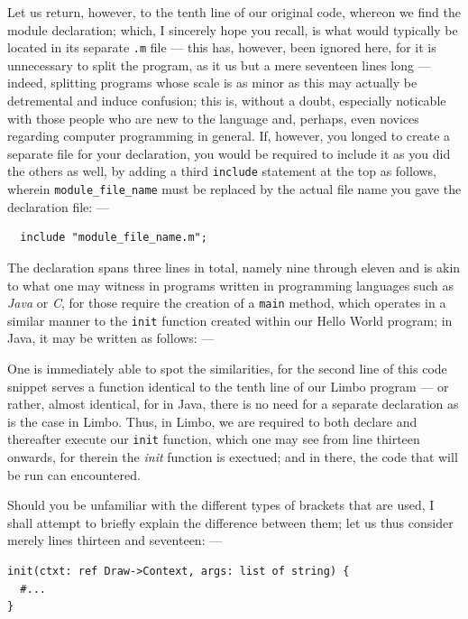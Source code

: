 \documentclass[a5paper,twoside,12pt]{report}
\begin{document}
Let us return, however, to the tenth line of our original code, whereon we find the module declaration; which, I sincerely hope you recall, is what would typically be located in its separate \texttt{.m} file — this has, however, been ignored here, for it is unnecessary to split the program, as it us but a mere seventeen lines long — indeed, splitting programs whose scale is as minor as this may actually be detremental and induce confusion; this is, without a doubt, especially noticable with those people who are new to the language and, perhaps, even novices regarding computer programming in general. If, however, you longed to create a separate file for your declaration, you would be required to include it as you did the others as well, by adding a third \texttt{include} statement at the top as follows, wherein \texttt{module\_file\_name} must be replaced by the actual file name you gave the declaration file: —

\begin{lstlisting}
  include "module_file_name.m";
\end{lstlisting}

The declaration spans three lines in total, namely nine through eleven and is akin to what one may witness in programs written in programming languages such as \textit{Java} or \textit{C}, for those require the creation of a \texttt{main} method, which operates in a similar manner to the \texttt{init} function created within our Hello World program; in Java, it may be written as follows: —



One is immediately able to spot the similarities, for the second line of this code snippet serves a function identical to the tenth line of our Limbo program — or rather, almost identical, for in Java, there is no need for a separate declaration as is the case in Limbo. Thus, in Limbo, we are required to both declare and thereafter execute our \texttt{init} function, which one may see from line thirteen onwards, for therein the \textit{init} function is exectued; and in there, the code that will be run can encountered.

Should you be unfamiliar with the different types of brackets that are used, I shall attempt to briefly explain the difference between them; let us thus consider merely lines thirteen and seventeen: —

\begin{lstlisting}
init(ctxt: ref Draw->Context, args: list of string) {
  #...
}
\end{lstlisting}
\end{document}
